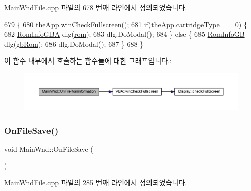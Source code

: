 Main\+Wnd\+File.\+cpp 파일의 678 번째 라인에서 정의되었습니다.


\begin{DoxyCode}
679 \{
680   \mbox{\hyperlink{_v_b_a_8cpp_a8095a9d06b37a7efe3723f3218ad8fb3}{theApp}}.\mbox{\hyperlink{class_v_b_a_a340eaeeb7fcfc242f08ac3442d991a96}{winCheckFullscreen}}();
681   \textcolor{keywordflow}{if}(\mbox{\hyperlink{_v_b_a_8cpp_a8095a9d06b37a7efe3723f3218ad8fb3}{theApp}}.\mbox{\hyperlink{class_v_b_a_af300759fcbc7eeb00ce73f956fc5ddb7}{cartridgeType}} == 0) \{
682     \mbox{\hyperlink{class_rom_info_g_b_a}{RomInfoGBA}} dlg(\mbox{\hyperlink{_globals_8cpp_adafc6ed627110c42f3893c9783f55320}{rom}});
683     dlg.DoModal();
684   \} \textcolor{keywordflow}{else} \{
685     \mbox{\hyperlink{class_rom_info_g_b}{RomInfoGB}} dlg(\mbox{\hyperlink{gb_globals_8cpp_ae4f6bd8162474dbcfdbc54c36d7f5695}{gbRom}});
686     dlg.DoModal();
687   \}
688 \}
\end{DoxyCode}
이 함수 내부에서 호출하는 함수들에 대한 그래프입니다.\+:
\nopagebreak
\begin{figure}[H]
\begin{center}
\leavevmode
\includegraphics[width=350pt]{class_main_wnd_a81e882a9db84a84f2507a63161b5bc4c_cgraph}
\end{center}
\end{figure}
\mbox{\label{class_main_wnd_a962abbb99f5b6bba3f05ba043358584e}} 
\subsubsection{\texorpdfstring{On\+File\+Save()}{OnFileSave()}}
{\footnotesize\ttfamily void Main\+Wnd\+::\+On\+File\+Save (\begin{DoxyParamCaption}{ }\end{DoxyParamCaption})\hspace{0.3cm}{\ttfamily [protected]}}



Main\+Wnd\+File.\+cpp 파일의 285 번째 라인에서 정의되었습니다.


